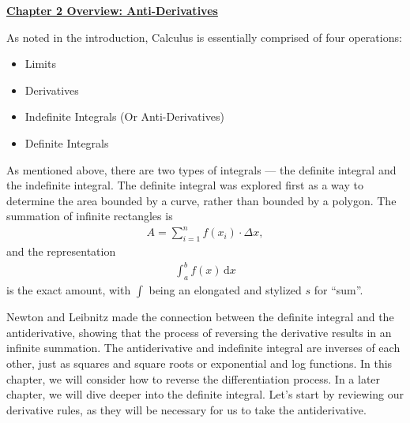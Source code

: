 \textbf{\underline{\large{Chapter 2 Overview: Anti-Derivatives}}} \par

As noted in the introduction, Calculus is essentially comprised of four operations: \begin{itemize}
    \item Limits
    \item Derivatives
    \item Indefinite Integrals (Or Anti-Derivatives)
    \item Definite Integrals
\end{itemize}

As mentioned above, there are two types of integrals --- the definite integral and the indefinite integral. The definite integral was explored first as a way to determine the area bounded by a curve, rather than bounded by a polygon. The summation of infinite rectangles is \begin{align*}
    A = \sum_{i = 1}^n f\left(x_i\right) \cdot \Delta x,
\end{align*}
and the representation \begin{align*}
    \int_a^b f(x) \,\mathrm{d}x
\end{align*}
is the exact amount, with $\int$ being an elongated and stylized $s$ for ``sum''. \par

Newton and Leibnitz made the connection between the definite integral and the antiderivative, showing that the process of reversing the derivative results in an infinite summation. The antiderivative and indefinite integral are inverses of each other, just as squares and square roots or exponential and log functions. In this chapter, we will consider how to reverse the differentiation process. In a later chapter, we will dive deeper into the definite integral. Let's start by reviewing our derivative rules, as they will be necessary for us to take the antiderivative. \par

